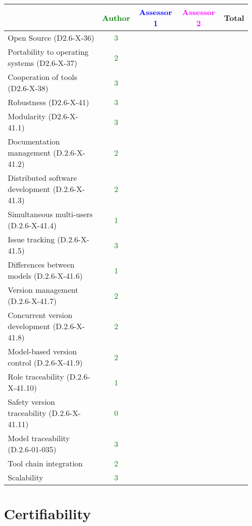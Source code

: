 \begin{tabular}{|l | c | c | c | c|}
\hline
& \textcolor{green}{Author} & \textcolor{blue}{Assessor 1} & \textcolor{magenta}{Assessor 2} & Total \\
\hline 
Open Source (D2.6-X-36) & \textcolor{green}{3} & & &  \\
\hline 
Portability to operating systems (D2.6-X-37) & \textcolor{green}{2} & & &  \\
\hline
Cooperation of tools (D2.6-X-38) & \textcolor{green}{3} & & &  \\
\hline
Robustness (D2.6-X-41) & \textcolor{green}{3} & & & \\
\hline
Modularity (D2.6-X-41.1) & \textcolor{green}{3} & & & \\
\hline
Documentation management (D.2.6-X-41.2) & \textcolor{green}{2} & & & \\
\hline
Distributed software development (D.2.6-X-41.3)  & \textcolor{green}{2} & & & \\
\hline
Simultaneous multi-users (D.2.6-X-41.4)   & \textcolor{green}{1} & & & \\
\hline
Issue tracking (D.2.6-X-41.5) & \textcolor{green}{3} & & & \\
\hline
Differences between models (D.2.6-X-41.6) & \textcolor{green}{1} & & & \\
\hline
Version management (D.2.6-X-41.7) & \textcolor{green}{2} & & & \\
\hline
Concurrent version development (D.2.6-X-41.8) & \textcolor{green}{2} & & & \\
\hline
Model-based version control (D.2.6-X-41.9) & \textcolor{green}{2} & & & \\
\hline
Role traceability (D.2.6-X-41.10) & \textcolor{green}{1} & & & \\
\hline
Safety version traceability (D.2.6-X-41.11) & \textcolor{green}{0} & & & \\
\hline
Model traceability (D.2.6-01-035) & \textcolor{green}{3} & & & \\
\hline
Tool chain integration & \textcolor{green}{2} & & & \\
\hline
Scalability & \textcolor{green}{3} & & & \\
\hline
\end{tabular}

\section{Certifiability}

